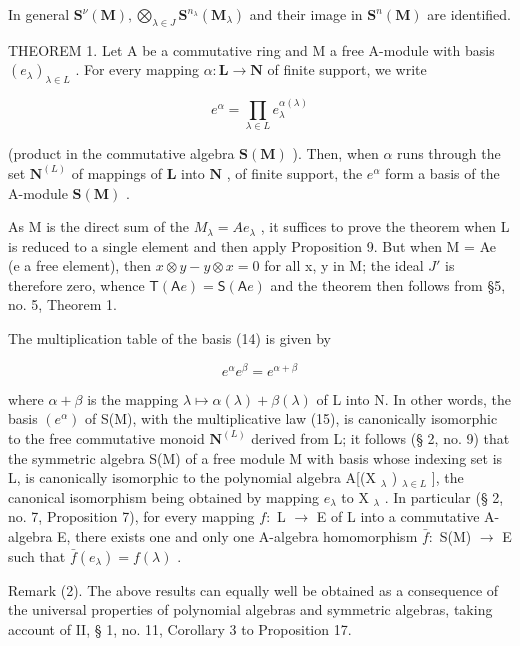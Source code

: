 In general \(\mathbf{S}^{\nu}(\mathbf{M}),\bigotimes_{\lambda \in J}\mathbf{S}^{n_{\lambda}}(\mathbf{M}_{\lambda})\) and their image in \(\mathbf{S}^n (\mathbf{M})\) are identified.

THEOREM 1. Let A be a commutative ring and M a free A-module with basis \((e_{\lambda})_{\lambda \in L}\) . For every mapping \(\alpha: \mathbf{L} \to \mathbf{N}\) of finite support, we write

\[
e ^ {\alpha} = \prod_ {\lambda \in L} e _ {\lambda} ^ {\alpha (\lambda)}\tag{14}
\]

(product in the commutative algebra \(\mathbf{S}(\mathbf{M})\) ). Then, when \(\alpha\) runs through the set \(\mathbf{N}^{(L)}\) of mappings of \(\mathbf{L}\) into \(\mathbf{N}\) , of finite support, the \(e^{\alpha}\) form a basis of the A-module \(\mathbf{S}(\mathbf{M})\) .

As M is the direct sum of the \(M_{\lambda} = Ae_{\lambda}\) , it suffices to prove the theorem when L is reduced to a single element and then apply Proposition 9. But when M = Ae (e a free element), then \(x \otimes y - y \otimes x = 0\) for all x, y in M; the ideal \(J'\) is therefore zero, whence \(\mathsf{T}(\mathsf{A}e) = \mathsf{S}(\mathsf{A}e)\) and the theorem then follows from §5, no. 5, Theorem 1.

The multiplication table of the basis (14) is given by

\[
e ^ {\alpha} e ^ {\beta} = e ^ {\alpha + \beta}\tag{15}
\]

where \(\alpha + \beta\) is the mapping \(\lambda \mapsto \alpha(\lambda) + \beta(\lambda)\) of L into N. In other words, the basis \((e^{\alpha})\) of S(M), with the multiplicative law (15), is canonically isomorphic to the free commutative monoid \(\mathbf{N}^{(L)}\) derived from L; it follows (§ 2, no. 9) that the symmetric algebra S(M) of a free module M with basis whose indexing set is L, is canonically isomorphic to the polynomial algebra A{[}(X \(_{\lambda}\) ) \(_{\lambda \in L}\) {]}, the canonical isomorphism being obtained by mapping \(e_{\lambda}\) to X \(_{\lambda}\) . In particular (§ 2, no. 7, Proposition 7), for every mapping \(f\colon\) L \(\to\) E of L into a commutative A-algebra E, there exists one and only one A-algebra homomorphism \(\bar{f}\colon\) S(M) \(\to\) E such that \(\bar{f}(e_{\lambda}) = f(\lambda)\) .

Remark (2). The above results can equally well be obtained as a consequence of the universal properties of polynomial algebras and symmetric algebras, taking account of II, § 1, no. 11, Corollary 3 to Proposition 17.

